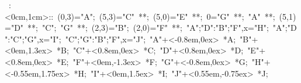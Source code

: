 
%

\hbox{
   \xy    <1cm,0cm>:<0cm,1cm>::
       (0,3)="A"; (5,3)="C" **\dir{-}; (5,0)="E" **\dir{-}; 
       0="G"  **\dir{-}; "A" **\dir{-}; (5,1)="D" **\dir{-}; 
       "C"; "G" **\dir{-}; (2,3)="B"; (2,0)="F" **\dir{-};
       {"A";"D":"B";"F",x}="H";  {"A";"D":"C";"G",x}="I";
       {"C";"G":"B";"F",x}="J"; 
       "A"+<-0.8em,0ex> *{A}; "B"+<0em,1.3ex> *{B};  
       "C"+<0.8em,0ex> *{C};  "D"+<0.8em,0ex> *{D};    
       "E"+<0.8em,0ex> *{E}; "F"+<0em,-1.3ex> *{F};  
       "G"+<-0.8em,0ex> *{G};  "H"+<-0.55em,1.75ex> *{H};    
       "I"+<0em,1.5ex> *{I};  "J"+<0.55em,-0.75ex> *{J};    
   \endxy}

